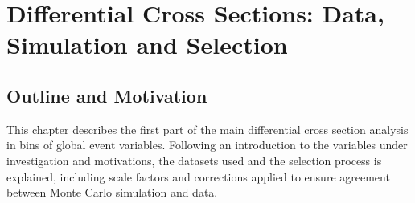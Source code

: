\chapter{Differential Cross Sections: Data, Simulation and Selection}
\label{c:Differential_Cross_Section:data_simulation_and_selection}

\section{Outline and Motivation}
\label{s:outline_and_motivation}
This chapter describes the first part of the main \ttbar differential cross section analysis in bins of global
event variables. Following an introduction to the variables under investigation and motivations, the datasets
used and the selection process is explained, including scale factors and corrections applied to ensure
agreement between Monte Carlo simulation and data.

